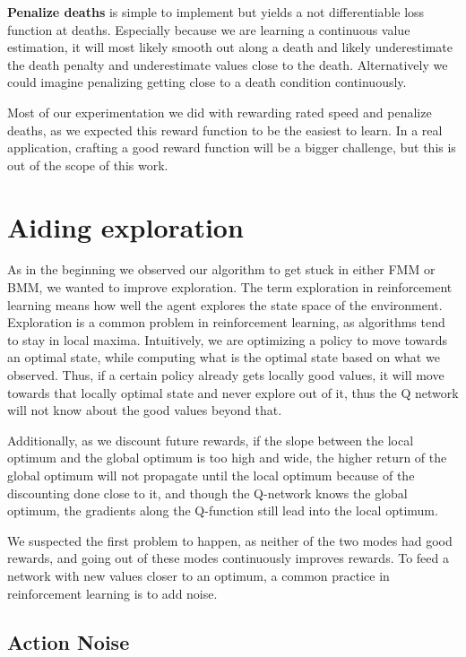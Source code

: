 \documentclass[hyperref,final,beleg]{cgvpub}
\begin{document}
\textbf{Penalize deaths} is simple to implement but yields a not differentiable loss function at deaths. Especially because we are learning a continuous value estimation, it will most likely smooth out along a death and likely underestimate the death penalty and underestimate values close to the death. Alternatively we could imagine penalizing getting close to a death condition continuously.

Most of our experimentation we did with rewarding rated speed and penalize deaths, as we expected this reward function to be the easiest to learn. In a real application, crafting a good reward function will be a bigger challenge, but this is out of the scope of this work.

\section{Aiding exploration}

As in the beginning we observed our algorithm to get stuck in either \ac{FMM} or \ac{BMM}, we wanted to improve exploration. The term exploration in reinforcement learning means how well the agent explores the state space of the environment. Exploration is a common problem in reinforcement learning, as algorithms tend to stay in local maxima. Intuitively, we are optimizing a policy to move towards an optimal state, while computing what is the optimal state based on what we observed. Thus, if a certain policy already gets locally good values, it will move towards that locally optimal state and never explore out of it, thus the Q network will not know about the good values beyond that. 

Additionally, as we discount future rewards, if the slope between the local optimum and the global optimum is too high and wide, the higher return of the global optimum will not propagate until the local optimum because of the discounting done close to it, and though the Q-network knows the global optimum, the gradients along the Q-function still lead into the local optimum.

We suspected the first problem to happen, as neither of the two modes had good rewards, and going out of these modes continuously improves rewards. To feed a network with new values closer to an optimum, a common practice in reinforcement learning is to add noise.

\subsection{Action Noise}
\end{document}

